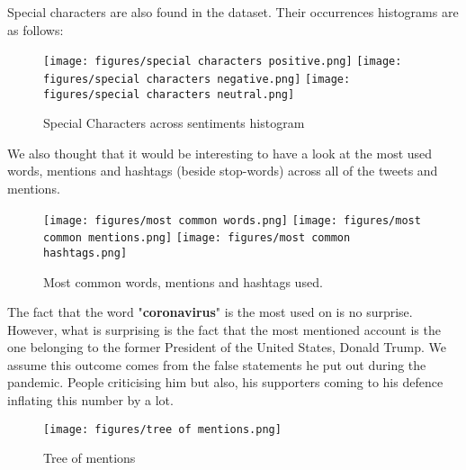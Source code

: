\documentclass[11pt, a4paper]{article}
\begin{document}
\begin{large}
Special characters are also found in the dataset. Their occurrences histograms are as follows:
\begin{figure}[H]
    \centering
    \texttt{[image: figures/special characters positive.png]}
     \texttt{[image: figures/special characters negative.png]}
      \texttt{[image: figures/special characters neutral.png]}
    \caption{Special Characters across sentiments histogram}
    \label{fig:enter-label}
\end{figure}

We also thought that it would be interesting to have a look at the most used words, mentions and hashtags (beside stop-words) across all of the tweets and mentions. 
\begin{figure}[H]
    \centering
    \texttt{[image: figures/most common words.png]}
    \texttt{[image: figures/most common mentions.png]}
    \texttt{[image: figures/most common hashtags.png]}
    \caption{Most common words, mentions and hashtags used.}
    \label{fig:enter-label}
\end{figure}

The fact that the word "\textbf{coronavirus}" is the most used on is no surprise. However, what is surprising is the fact that the most mentioned account is the one belonging to the former President of the United States, Donald Trump. We assume this outcome comes from the false statements he put out during the pandemic. People criticising him but also, his supporters coming to his defence inflating this number by a lot.

\begin{figure}[H]
    \centering
    \texttt{[image: figures/tree of mentions.png]}
    \caption{Tree of mentions}
    \label{fig:enter-label}
\end{figure}



\end{large}
\end{document}
